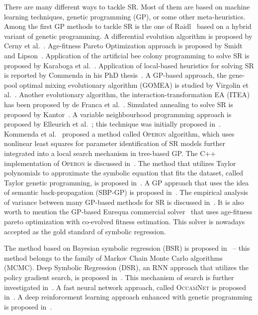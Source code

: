 \documentclass{bmcart}
\begin{document}
There are many different ways to tackle SR. Most of them are based on   machine learning techniques, genetic programming (GP), or some other meta-heuristics. Among the first GP methods to tackle SR is the one of Raidl~\cite{raidl1998hybrid} based on a hybrid variant of genetic programming. A differential evolution algorithm is proposed by Cerny et al.~\cite{cerny2008using}. Age-fitness Pareto Optimization approach is proposed by Smidt and Lipson~\cite{schmidt2010age}.  Application of the artificial bee colony programming to solve SR is proposed by Karaboga et al.~\cite{karaboga2012artificial}. 
Application of local-based heuristics for solving SR is reported by Commenda in his PhD thesis~\cite{kommenda2018local}. A GP-based approach, the gene-pool optimal mixing evolutionary algorithm (\textsc{GOMEA}) is studied by Virgolin et al.~\cite{virgolin2021improving}.  Another evolutionary algorithm, the interaction-transformation EA (\textsc{ITEA}) has been proposed by de Franca et al.~\cite{de2021interaction}. Simulated annealing to solve SR is proposed by Kantor~\cite{kantor2021simulated}. A variable neighbourhood programming approach  is proposed by Elleurich et al.~\cite{elleuch2020variable}; this technique was initially proposed in~\cite{elleuch2016variable}. 
Kommenda et al.~\cite{kommenda2020parameter} proposed a method called \textsc{Operon} algorithm, which uses nonlinear least squares for parameter identification of SR models further integrated into a local search mechanism in tree-based GP. The C++ implementation of \textsc{Operon} is discussed in~\cite{burlacu2020operon}. The method that utilizes Taylor polynomials to approximate the symbolic equation that fits the dataset, called Taylor genetic programming, is proposed in~\cite{he2022taylor}. A GP approach that uses the idea of semantic back-propagation (SBP-GP) is proposed in~\cite{virgolin2019linear}.  The empirical analysis of variance between many GP-based methods for SR is discussed in~\cite{kammerer2021empirical}. It is also worth to mention the GP-based Eurequa commercial solver~\cite{schmidt2009distilling, schmidt2011machine} that uses age-fitness pareto optimization with co-evolved fitness estimation. This solver is nowadays accepted as the gold standard of symbolic regression.   

The method based on Bayesian symbolic regression (\textsc{BSR}) is proposed in~\cite{jin2019bayesian} -- this method belongs to the family of Markov Chain Monte Carlo algorithms (MCMC). Deep Symbolic Regression (\textsc{DSR}), an RNN approach that utilizes the policy gradient search, is proposed in~\cite{petersen2019deep}. This mechanism of search is further investigated in~\cite{landajuela2021improving}. A fast neural network approach, called \textsc{OccamNet} is proposed in~\cite{costa2020fast}.  A deep reinforcement learning approach enhanced with genetic programming is proposed in~\cite{mundhenk2021symbolic}. 
\end{document}
